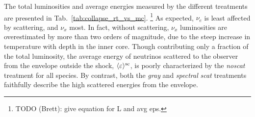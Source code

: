 \documentclass[aps,floatfix,prd,superscriptaddress,twocolumn]{revtex4-1}
\begin{document}
The total luminosities and average energies
measured by the different treatments are
presented in Tab.~\ref{tab:collapse_rt_vs_mc}.
\footnote{TODO (Brett): give equation for L and avg eps.}
As expected, $\nu_e$ is least affected by scattering, and $\nu_x$ most.
In fact, without scattering, $\nu_x$ luminosities are overestimated by more than
two orders of magnitude, due to the steep increase in temperature with depth
in the inner core.
Though contributing only a fraction of the total luminosity,
the average energy of neutrinos scattered to the observer from the envelope
outside the shock, $\langle\varepsilon\rangle^{\rm sc}$,
is poorly characterized by the \emph{noscat} treatment for all species.
By contrast, both the \emph{gray} and \emph{spectral} \emph{scat} treatments
faithfully describe the high scattered energies from the envelope.
\end{document}

